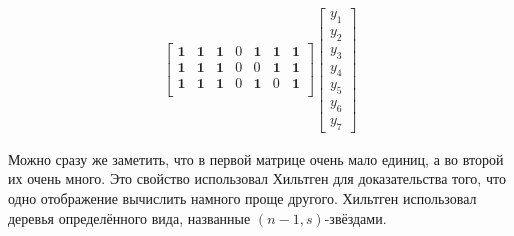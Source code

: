 \documentclass[oneside, a4paper]{article}
\theoremstyle{plain}
\theoremstyle{remark}
\begin{document}
\[\begin{aligned}
\begin{bmatrix}
\mathbf 1 & \mathbf 1 & \mathbf 1 & 0 & \mathbf 1 & \mathbf 1 & \mathbf 1 \\
\mathbf 1 & \mathbf 1 & \mathbf 1 & 0 & 0 & \mathbf 1 & \mathbf 1 \\
\mathbf 1 & \mathbf 1 & \mathbf 1 & 0 & \mathbf 1 & 0 & \mathbf 1 \\
\end{bmatrix} \begin{bmatrix}
y_1 \\ y_2 \\ y_3 \\ y_4 \\ y_5 \\ y_6 \\ y_7
\end{bmatrix}
\end{aligned}
\]

Можно сразу же заметить, что в первой матрице очень мало единиц, а во второй их
очень много. Это свойство использовал Хильтген для доказательства того, что одно
отображение вычислить намного проще другого. Хильтген использовал деревья
определённого вида, названные $(n - 1, s)$-звёздами.
\end{document}

